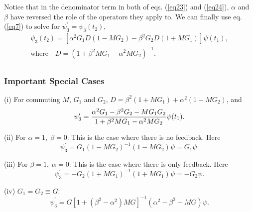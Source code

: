 Notice that in the denominator term in both of eqs. (\ref{eq23}) and (\ref{eq24}),
$\alpha $ and $\beta $ have reversed the role of the operators they apply
to. We can finally use eq. (\ref{eq7}) to solve for $\psi _{3} ^{\prime}  = \psi
_{3} (t_{2} )$,
\begin{equation}
\label{eq25}
\begin{array}{l}
 \psi _{3} (t_{2} ) = [\alpha ^{2}G_{1} D(1 - MG_{2} ) - \beta ^{2}G_{2} D(1
+ MG_{1} )]\psi (t_{1} ), \\
 \textrm{where}\quad D = (1 + \beta ^{2}MG_{1} - \alpha ^{2}MG_{2} )^{ - 1}. \\
 \end{array}
\end{equation}





\subsubsection*{Important Special Cases}


\noindent
(i) For commuting $M$, $G_1$ and $G_2$,
$D = \beta ^{2}(1+MG_{1}) + \alpha ^{2}(1-MG_{2} )$, and
\begin{equation}
\label{eq25a}
\psi _{3} ^{\prime}  =
{\alpha^2G_1-\beta^2 G_2-MG_1G_2\over
1+  \beta^2 MG_1-\alpha^2 MG_2}
 \psi (t_{1} ).
\end{equation}



\noindent
(ii) For $\alpha = 1,\;\beta = 0$: This is the case where there is no
feedback. Here
\begin{equation}
\label{eq26}
\psi _{3} ^{\prime}  = G_{1} (1 - MG_{2} )^{ - 1}(1 - MG_{2} )\psi = G_{1}
\psi .
\end{equation}





\noindent
(iii) For $\beta = 1,\;\alpha = 0$: This is the case where there is only
feedback. Here
\begin{equation}
\label{eq27}
\psi _{3} ^{\prime}  = - G_{2} (1 + MG_{1} )^{ - 1}(1 + MG_{1} )\psi = -
G_{2} \psi .
\end{equation}





\noindent
(iv) $G_{1} = G_{2} \equiv G:$
\begin{equation}
\label{eq28}
\psi _{3} ^{\prime}  = G[1 + (\beta ^{2} - \alpha ^{2})MG]^{ - 1}(\alpha
^{2} - \beta ^{2} - MG)\psi .
\end{equation}





